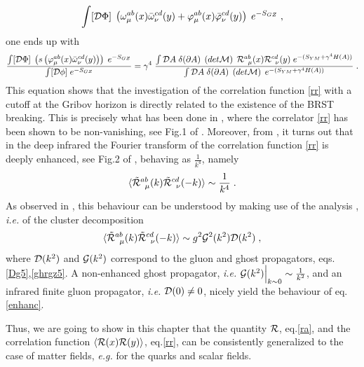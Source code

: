 \begin{equation}
\int [{\cal D} {\Phi}] \; \left( \omega^{ab}_\mu(x) {\bar \omega}^{cd}_\nu(y) + \varphi^{ab}_\mu(x) {\bar \varphi}^{cd}_\nu(y) \right)   \; e^{-S_{GZ}} \;,  \label{loce}
\end{equation}
one ends up with
\begin{equation} 
\frac{ \int [{\cal D} {\Phi}] \;   \left( s \left( \varphi^{ab}_\mu(x) {\bar
\omega}^{cd}_\nu(y)  \right)   \right) \; e^{-S_{GZ}} }{ \int [{\cal D \phi}]    \;
e^{-S_{GZ}}}  =\gamma^4 \; \frac{  \int {\cal D}A\; \delta(\partial A) \; \left( det{\cal M}
\right) \; {\cal R}^{ab}_{\;\;\mu}(x)  {\cal R}^{cd}_{\;\;\nu}(y)  \; e^{-(S_{YM}+\gamma^4 H(A)
)} } {\int {\cal D}A\; \delta(\partial A) \; \left( det{\cal M} \right)   \;
e^{-(S_{YM}+\gamma^4 H(A) )} } \;. 
\label{brstbra}
\end{equation}
This equation shows  that the investigation of the correlation function \eqref{rr} with a
cutoff at the Gribov horizon is directly related to the existence of the BRST breaking. This is
precisely what has been done in \cite{Cucchieri:2014via}, where the correlator \eqref{rr} has
been shown to be non-vanishing, see Fig.1 of \cite{Cucchieri:2014via}. Moreover, from
\cite{Cucchieri:2014via}, it turns out that in the deep infrared the Fourier transform of the
correlation function \eqref{rr} is deeply enhanced, see Fig.2 of \cite{Cucchieri:2014via},
behaving as $\frac{1}{k^4}$, namely 
\begin{equation} 
\langle \tilde{\cal R}^{ab}_{\;\;\mu}(k)  \tilde {\cal R}^{cd}_{\;\;\nu}(-k)  \rangle  \sim
\frac{1}{k^4} \;.  
\label{enhanc}
\end{equation}  
As observed in \cite{Cucchieri:2014via}, this behaviour can be  understood by making use of the
analysis \cite{Zwanziger:2010iz}, {\it i.e.} of the cluster decomposition 
\begin{equation}
 \langle {\tilde {\cal R}} ^{ab}_{\;\;\mu}(k)  {\tilde {\cal R}}^{cd}_{\;\;\nu}(-k)  \rangle   \sim  g^2 {\cal G}^2(k^2) {\cal D}(k^2) \;, \label{clust} 
\end{equation} 
where ${\cal D}(k^2)$ and ${\cal G}(k^2)$ correspond to the   gluon and ghost propagators,
eqs.\eqref{Dg5},\eqref{ghrgz5}. A non-enhanced ghost propagator, {\it i.e.}  ${\cal G}(k^2)
\Big|_{k\sim 0} \sim \frac{1}{k^2}$, and an infrared finite gluon propagator, {\it i.e.} ${\cal
D}(0) \neq 0$, nicely yield the behaviour of eq.\eqref{enhanc}. 

Thus, we are going to show in this chapter that the quantity ${\cal R}$, eq.\eqref{ra}, and
the correlation function  $ \langle {\cal R}(x)  {\cal R}(y)  \rangle $, eq.\eqref{rr}, can be
consistently generalized to the case of matter fields, {\it e.g.} for the quarks and scalar
fields.




